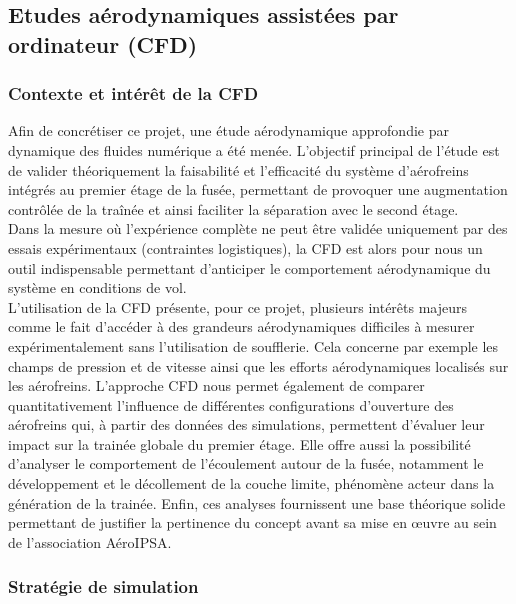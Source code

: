 \subsection{Etudes aérodynamiques assistées par ordinateur (\acrshort{CFD})}

\subsubsection{Contexte et intérêt de la \acrshort{CFD}}

Afin de concrétiser ce projet, une étude aérodynamique approfondie par dynamique des fluides numérique a été menée. L’objectif
principal de l’étude est de valider théoriquement la faisabilité et l’efficacité du système d’aérofreins intégrés au premier
étage de la fusée, permettant de provoquer une augmentation contrôlée de la traînée et ainsi faciliter la séparation
avec le second étage.\\

Dans la mesure où l’expérience complète ne peut être validée uniquement par des essais expérimentaux (contraintes logistiques),
la \acrshort{CFD} est alors pour nous un outil indispensable permettant d’anticiper le comportement aérodynamique du système en
conditions de vol.\\

L’utilisation de la \acrshort{CFD} présente, pour ce projet, plusieurs intérêts majeurs comme le fait d’accéder à des grandeurs
aérodynamiques difficiles à mesurer expérimentalement sans l’utilisation de soufflerie. Cela concerne par exemple les champs de
pression et de vitesse ainsi que les efforts aérodynamiques localisés sur les aérofreins. L’approche \acrshort{CFD} nous permet
également de comparer quantitativement l’influence de différentes configurations d’ouverture des aérofreins qui, à partir des
données des simulations, permettent d’évaluer leur impact sur la trainée globale du premier étage. Elle offre aussi la
possibilité d’analyser le comportement de l’écoulement autour de la fusée, notamment le développement et le décollement de la
couche limite, phénomène acteur dans la génération de la trainée. Enfin, ces analyses fournissent une base théorique solide
permettant de justifier la pertinence du concept avant sa mise en œuvre au sein de l’association AéroIPSA.

\subsubsection{Stratégie de simulation}

